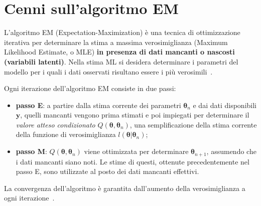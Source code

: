 \section[Cenni sull'algoritmo EM]{Cenni sull'algoritmo EM}
L'algoritmo EM (Expectation-Maximization) è una tecnica di ottimizzazione iterativa per determinare la stima a massima verosimiglianza (Maximum Likelihood Estimate, o MLE) \textbf{in presenza di dati mancanti o nascosti (variabili latenti)}. Nella stima ML si desidera determinare i parametri del modello per i quali i dati osservati risultano essere i più verosimili~\citep{paper_EM_algorithm}. \par Ogni iterazione dell'algoritmo EM consiste in due passi:
\begin{itemize}
	\item \textbf{passo E}: a partire dalla stima corrente dei parametri $\boldsymbol{\theta}_n$ e dai dati disponibili $\mathbf{y}$, quelli mancanti vengono prima stimati e poi impiegati per determinare il \textit{valore atteso condizionato} $Q(\boldsymbol{\theta},\boldsymbol{\theta}_n)$, una semplificazione della stima corrente della funzione di verosimiglianza $l(\boldsymbol{\theta}|\boldsymbol{\theta}_n)$;
	\item \textbf{passo M}: $Q(\boldsymbol{\theta},\boldsymbol{\theta}_n)$ viene ottimizzata per determinare $\boldsymbol{\theta}_{n+1}$, assumendo che i dati mancanti siano noti. Le stime di questi, ottenute precedentemente nel passo E, sono utilizzate al posto dei dati mancanti effettivi.
\end{itemize}
La convergenza dell'algoritmo è garantita dall'aumento della verosimiglianza a ogni iterazione~\citep{paper_EM_algorithm}.

